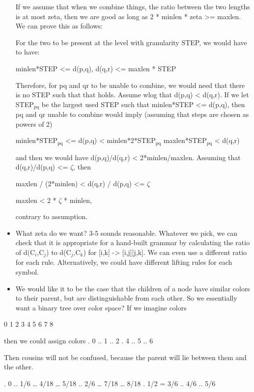 \documentclass{book}
\begin{document}
\begin{itemize}
    If we assume that when we combine things, the ratio between the
    two lengths is at most zeta, then we are good as long as 2 *
    minlen * zeta >= maxlen. We can prove this as follows:

    For the two to be present at the level with granularity STEP, we
    would have to have:

      minlen*STEP <= d(p,q), d(q,r) <= maxlen * STEP 

    Therefore, for pq and qr to be unable to combine, we would need
    that there is no STEP such that that holds. Assume wlog that
    d(p,q) < d(q,r). If we let STEP$_{\mathrm{pq}}$ be the largest used STEP such
    that minlen*STEP <= d(p,q), then pq and qr unable to combine would
    imply (assuming that steps are chosen as powers of 2)

      minlen*STEP$_{\mathrm{pq}}$ <= d(p,q) < minlen*2*STEP$_{\mathrm{pq}}$
      maxlen*STEP$_{\mathrm{pq}}$ < d(q,r)

    and then we would have d(p,q)/d(q,r) < 2*minlen/maxlen. Assuming
    that d(q,r)/d(p,q) <= $\zeta$, then

    maxlen / (2*minlen) < d(q,r) / d(p,q) <= $\zeta$

    maxlen < 2 * $\zeta$ * minlen,

    contrary to assumption.
\item What zeta do we want? 3-5 sounds reasonable. Whatever we pick, we
    can check that it is appropriate for a hand-built grammar by
    calculating the ratio of d(C$_i$,C$_j$) to d(C$_j$,C$_k$) for [i,k] ->
    [i,j][j,k]. We can even use a different ratio for each rule.
    Alternatively, we could have different lifting rules for each
    symbol.
\end{itemize}
\begin{itemize}
\item We would like it to be the case that the children of a node have
    similar colors to their parent, but are distinguishable from each
    other. So we essentially want a binary tree over color space? If
    we imagine colors
\end{itemize}

0 1 2 3 4 5 6 7 8

then we could assign colors
. 0
.. 1
.. 2
. 4
.. 5
.. 6

Then cousins will not be confused, because the parent will lie between
them and the other.

. 0
.. 1/6
\ldots{} 4/18
\ldots{} 5/18
.. 2/6
\ldots{} 7/18
\ldots{} 8/18
. 1/2 = 3/6
.. 4/6
.. 5/6
\end{document}
